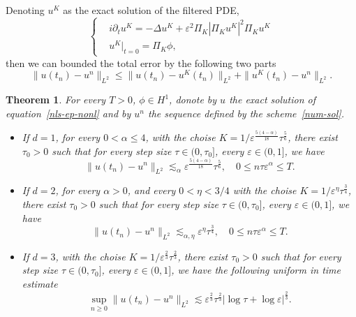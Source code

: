 \documentclass[10pt,a4paper]{article}
\newtheorem{theorem}{Theorem}[section]
\begin{document}
  Denoting \(u^K\) as the exact solution of the filtered PDE,
  \begin{equation}\label{nls-fil} %
    \left\{
    \begin{aligned}
      & i\partial_t u^K = -\Delta u^K + \varepsilon^2 \Pi_K|\Pi_K u^K|^2 \Pi_K u^K \\
      & u^K|_{t=0} = \Pi_K\phi,
    \end{aligned}
    \right.
  \end{equation}
  then we can bounded the total error by the following two parts
  \begin{equation}\label{seperr}
    \| u(t_n) - u^n \|_{L^2} \leq \| u(t_n) - u^K(t_n) \|_{L^2} + 
    \| u^K(t_n) - u^n \|_{L^2}.
  \end{equation}

  
  \begin{theorem}\label{main}
    For every \( T > 0 \), \( \phi \in H^1 \), donote by \(u\) the exact solution
    of equation~\eqref{nls-ep-nonl} and by \(u^n\) the sequence defined by the 
    scheme~\eqref{num-sol}.
    \begin{itemize}
      \item If \(d=1\), for every \(0 < \alpha \leq 4\), with the choise 
        \(K=1/\varepsilon^\frac{5(4-\alpha)}{18}\tau^\frac56\), there exist \(\tau_0 > 0\) 
        such that for every step size \(\tau \in (0,\tau_0]\), every 
        \( \varepsilon \in (0,1] \), we have 
        \[ \|u(t_n)-u^n\|_{L^2} \lesssim_\alpha \varepsilon^\frac{5(4-\alpha)}{18}\tau^\frac56, \quad 
        0 \leq n\tau\varepsilon^\alpha \leq T. \]
      \item If \(d=2\), for every \(\alpha > 0\), and every \(0 < \eta < 3/4\) with 
        the choise \(K=1/\varepsilon^\eta\tau^\frac34\), there exist \(\tau_0 > 0\) 
        such that for every step size \(\tau \in (0,\tau_0]\), every 
        \( \varepsilon \in (0,1] \), we have
        \[ \|u(t_n)-u^n\|_{L^2} \lesssim_{\alpha,\eta} \varepsilon^\eta \tau^\frac34, \quad 
        0 \leq n\tau\varepsilon^\alpha \leq T. \]
      \item If \(d=3\), with the choise \(K=1/\varepsilon^\frac23\tau^\frac23\), 
        there exist \(\tau_0 > 0\) 
        such that for every step size \(\tau \in (0,\tau_0]\), every 
        \( \varepsilon \in (0,1] \), 
        we have the following uniform in time estimate
        \[ \sup_{n \geq 0} \|u(t_n)-u^n\|_{L^2} \lesssim \varepsilon^\frac23 
        \tau^\frac23|\log\tau+\log\varepsilon|^\frac23. \]
    \end{itemize}
  \end{theorem}
\end{document}
